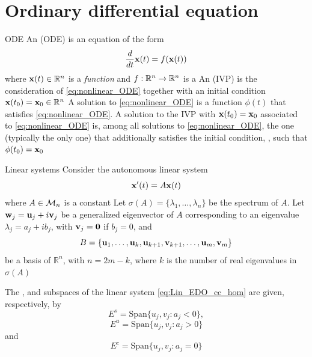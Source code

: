 \documentclass[aspectratio=169]{beamer}
\begin{document}
\section{Ordinary differential equation}

\begin{frame}{ODE}
An  (ODE) is an equation of the form 
\begin{equation}\label{eq:nonlinear_ODE}
\dfrac{d}{dt}\mathbf{x}(t)= f(\mathbf{x}(t))
\end{equation}
where $\mathbf{x}(t)\in \mathbb{R}^n$ is a \emph{function} and $f:\mathbb{R}^n \to \mathbb{R}^n$ is a 
\vfill
An  (IVP) is the consideration of \eqref{eq:nonlinear_ODE} together with an initial condition $\mathbf{x}(t_0)=\mathbf{x}_0\in\mathbb{R}^n$
\vfill
A solution to \eqref{eq:nonlinear_ODE} is a function $\phi(t)$ that satisfies \eqref{eq:nonlinear_ODE}. A solution to the IVP with $\mathbf{x}(t_0)=\mathbf{x}_0$ associated to \eqref{eq:nonlinear_ODE} is, among all solutions to \eqref{eq:nonlinear_ODE}, the one (typically the only one) that additionally satisfies the initial condition, \ie, such that $\phi(t_0)=\mathbf{x}_0$
\end{frame}

\begin{frame}{Linear systems}
Consider the autonomous linear system
\begin{equation}\label{eq:Lin_EDO_cc_hom}
\mathbf{x}'(t)=A\mathbf{x}(t)
\end{equation}
where $A\in\mathcal{M}_n$ is a constant
\vfill
Let $\sigma(A)=\{\lambda_1,\ldots,\lambda_n\}$ be the spectrum of $A$.
Let $\mathbf{w}_j=\mathbf{u}_j+i\mathbf{v}_j$ be a generalized eigenvector of $A$ corresponding to an eigenvalue $\lambda_j=a_j+ib_j$, with $\bv_j=\b0$ if $b_j=0$, and 
\[
B=\{\mathbf{u}_1,\ldots,\mathbf{u}_k,\mathbf{u}_{k+1},\mathbf{v}_{k+1},\ldots,\mathbf{u}_m,\mathbf{v}_m\}
\]
be a basis of $\mathbb{R}^n$, with $n=2m-k$, where $k$ is the number of real eigenvalues in $\sigma(A)$
\end{frame}

\begin{frame}
\begin{definition}
The ,  and  subspaces of the linear system \eqref{eq:Lin_EDO_cc_hom} are given, respectively, by
\[
E^s=\textrm{Span}\{u_j,v_j:a_j<0\},
\]
\[
E^u=\textrm{Span}\{u_j,v_j:a_j>0\}
\]
and
\[
E^c=\textrm{Span}\{u_j,v_j:a_j=0\}
\]
\end{definition}
\end{frame}
\end{document}
